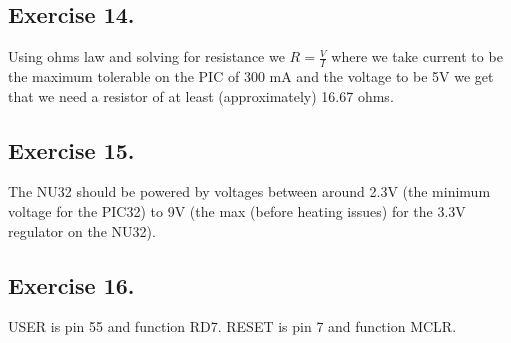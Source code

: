 \documentclass[12pt]{article}
\begin{document}
\subsection*{Exercise 14.}
Using ohms law and solving for resistance we $R = \frac{V}{I}$ where we take current to be the maximum tolerable on the PIC of 300 mA and the voltage to be 5V we get that we need a resistor of at least (approximately) 16.67 ohms.

\subsection*{Exercise 15.}
The NU32 should be powered by voltages between around 2.3V (the minimum voltage for the PIC32) to 9V (the max (before heating issues) for the 3.3V regulator on the NU32).

\subsection*{Exercise 16.}
USER is pin 55 and function RD7.
RESET is pin 7 and function MCLR.
\end{document}
